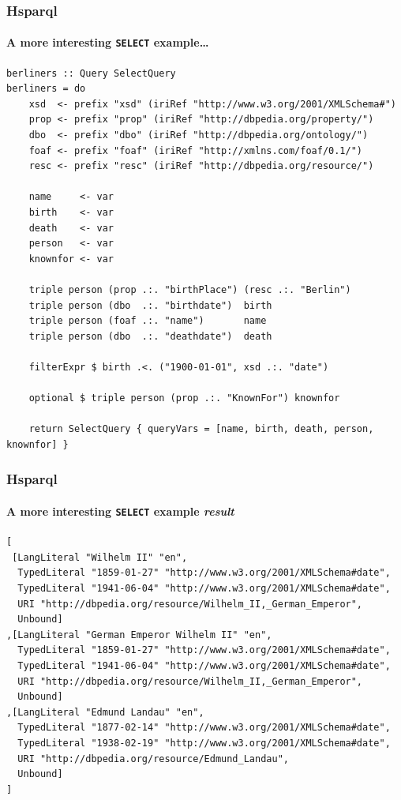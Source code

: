 \documentclass{beamer}
\begin{document}
\begin{frame}[fragile]
\frametitle{Hsparql}
\framesubtitle{A more interesting \texttt{SELECT} example\ldots}

\tiny
\begin{verbatim}
berliners :: Query SelectQuery
berliners = do
    xsd  <- prefix "xsd" (iriRef "http://www.w3.org/2001/XMLSchema#")
    prop <- prefix "prop" (iriRef "http://dbpedia.org/property/")
    dbo  <- prefix "dbo" (iriRef "http://dbpedia.org/ontology/")
    foaf <- prefix "foaf" (iriRef "http://xmlns.com/foaf/0.1/")
    resc <- prefix "resc" (iriRef "http://dbpedia.org/resource/")

    name     <- var
    birth    <- var
    death    <- var
    person   <- var
    knownfor <- var

    triple person (prop .:. "birthPlace") (resc .:. "Berlin")
    triple person (dbo  .:. "birthdate")  birth
    triple person (foaf .:. "name")       name
    triple person (dbo  .:. "deathdate")  death

    filterExpr $ birth .<. ("1900-01-01", xsd .:. "date")

    optional $ triple person (prop .:. "KnownFor") knownfor

    return SelectQuery { queryVars = [name, birth, death, person, knownfor] }
\end{verbatim}

\end{frame}


\begin{frame}[fragile]
\frametitle{Hsparql}
\framesubtitle{A more interesting \texttt{SELECT} example \emph{result}}

\scriptsize
\begin{verbatim}
[
 [LangLiteral "Wilhelm II" "en",
  TypedLiteral "1859-01-27" "http://www.w3.org/2001/XMLSchema#date",
  TypedLiteral "1941-06-04" "http://www.w3.org/2001/XMLSchema#date",
  URI "http://dbpedia.org/resource/Wilhelm_II,_German_Emperor",
  Unbound]
,[LangLiteral "German Emperor Wilhelm II" "en",
  TypedLiteral "1859-01-27" "http://www.w3.org/2001/XMLSchema#date",
  TypedLiteral "1941-06-04" "http://www.w3.org/2001/XMLSchema#date",
  URI "http://dbpedia.org/resource/Wilhelm_II,_German_Emperor",
  Unbound]
,[LangLiteral "Edmund Landau" "en",
  TypedLiteral "1877-02-14" "http://www.w3.org/2001/XMLSchema#date",
  TypedLiteral "1938-02-19" "http://www.w3.org/2001/XMLSchema#date",
  URI "http://dbpedia.org/resource/Edmund_Landau",
  Unbound]
]
\end{verbatim}

\end{frame}
\end{document}
